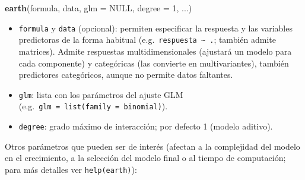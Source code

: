 \documentclass[
]{book}
\newenvironment{Shaded}{\begin{snugshade}}{\end{snugshade}}
\newcommand{\DataTypeTok}[1]{\textcolor[rgb]{0.13,0.29,0.53}{#1}}
\newcommand{\DecValTok}[1]{\textcolor[rgb]{0.00,0.00,0.81}{#1}}
\newcommand{\KeywordTok}[1]{\textcolor[rgb]{0.13,0.29,0.53}{\textbf{#1}}}
\newcommand{\NormalTok}[1]{#1}
\newcommand{\OtherTok}[1]{\textcolor[rgb]{0.56,0.35,0.01}{#1}}
\theoremstyle{break}
\theoremstyle{definition}
\theoremstyle{definition}
\theoremstyle{definition}
\theoremstyle{remark}
\begin{document}
\begin{Shaded}
\begin{Highlighting}[]
\KeywordTok{earth}\NormalTok{(formula, data, }\DataTypeTok{glm =} \OtherTok{NULL}\NormalTok{, }\DataTypeTok{degree =} \DecValTok{1}\NormalTok{, ...) }
\end{Highlighting}
\end{Shaded}

\begin{itemize}
\item
  \texttt{formula} y \texttt{data} (opcional): permiten especificar la respuesta y las variables predictoras de la forma habitual (e.g.~\texttt{respuesta\ \textasciitilde{}\ .}; también admite matrices). Admite respuestas multidimensionales (ajustará un modelo para cada componente) y categóricas (las convierte en multivariantes), también predictores categóricos, aunque no permite datos faltantes.
\item
  \texttt{glm}: lista con los parámetros del ajuste GLM (e.g.~\texttt{glm\ =\ list(family\ =\ binomial)}).
\item
  \texttt{degree}: grado máximo de interacción; por defecto 1 (modelo aditivo).
\end{itemize}

Otros parámetros que pueden ser de interés (afectan a la complejidad del modelo en el crecimiento, a la selección del modelo final o al tiempo de computación; para más detalles ver \texttt{help(earth)}):
\end{document}
